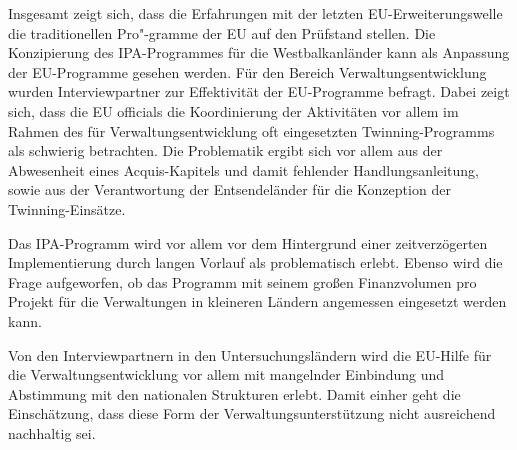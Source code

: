 Insgesamt zeigt sich, dass die Erfahrungen mit der letzten EU-Erweiterungswelle die traditionellen Pro"-gramme der EU auf den Prüfstand stellen. Die Konzipierung des IPA-Programmes für die Westbalkanländer kann als Anpassung der EU-Programme gesehen werden. Für den Bereich Verwaltungsentwicklung wurden Interviewpartner zur Effektivität der EU-Programme befragt. Dabei zeigt sich, dass die EU officials die Koordinierung der Aktivitäten vor allem im Rahmen des für Verwaltungsentwicklung oft eingesetzten Twinning-Programms als schwierig betrachten. Die Problematik ergibt sich vor allem aus der Abwesenheit eines Acquis-Kapitels und damit fehlender Handlungsanleitung, sowie aus der Verantwortung der Entsendeländer für die Konzeption der Twinning-Einsätze.\par
Das IPA-Programm wird vor allem vor dem Hintergrund einer zeitverzögerten Implementierung durch langen Vorlauf als problematisch erlebt. Ebenso wird die Frage aufgeworfen, ob das Programm mit seinem großen Finanzvolumen pro Projekt für die Verwaltungen in kleineren Ländern angemessen eingesetzt werden kann.\par
Von den Interviewpartnern in den Untersuchungsländern wird die EU-Hilfe für die Verwaltungsentwicklung vor allem mit mangelnder Einbindung und Abstimmung mit den nationalen Strukturen erlebt. Damit einher geht die Einschätzung, dass diese Form der Verwaltungsunterstützung nicht ausreichend nachhaltig sei. 

